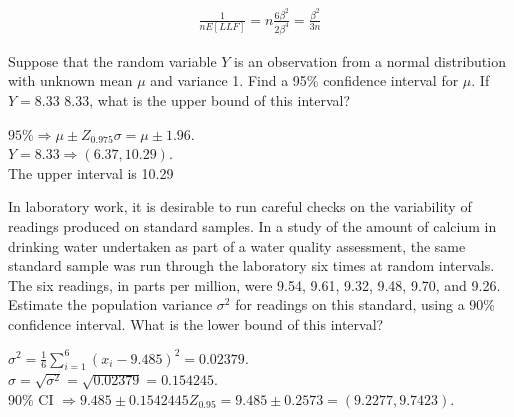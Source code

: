 \documentclass[answers]{exam}
\begin{document}
\begin{questions}
\begin{solution}
	\begin{align*}
		\frac{1}{nE[LLF]}
		= n\frac{6\beta^2}{2\beta^4}
		= \frac{\beta^2}{3n}
	\end{align*}
\end{solution}
	
\setcounter{question}{9}

\question 
Suppose that the random variable \(Y\) is an observation from a 
normal distribution with unknown mean \(\mu\) and variance 1. 
Find a 95\% confidence interval for \(\mu\). If \(Y=8.33\)
8.33, what is the upper bound of this interval?
\begin{solution}
	\(95\% \Rightarrow \mu \pm Z_{0.975} \sigma = \mu \pm 1.96 \). \\
	\(Y=8.33 \Rightarrow (6.37,10.29)\). \\
	The upper interval is 10.29
\end{solution}

\question 
In laboratory work, it is desirable to run careful checks on the variability of readings 
produced on standard samples. In a study of the amount of calcium in drinking 
water undertaken as part of a water quality assessment, the same standard 
sample was run through the laboratory six times at random intervals. The six 
readings, in parts per million, were 9.54, 9.61, 9.32, 9.48, 9.70, and 9.26. Estimate 
the population variance \(\sigma^2\) for readings on this standard, using a 90\% confidence 
interval. What is the lower bound of this interval?
\begin{solution}
	\(\sigma^2 = \frac{1}{6}\sum_{i=1}^{6}(x_i-9.485)^2 = 0.02379\). \\
	\(\sigma=\sqrt{\sigma^2}= \sqrt{0.02379} =0.154245\). \\
	90\% CI \(\Rightarrow 9.485\pm 0.1542445 Z_{0.95} = 9.485 \pm 0.2573 = (9.2277,9.7423)\).
\end{solution}

\setcounter{question}{12}


\end{questions}
\end{document}
